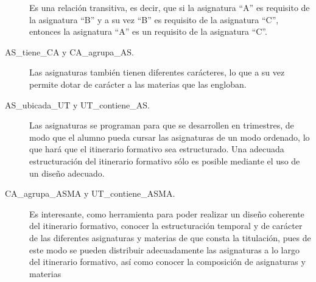 \begin{description}
    		Es una relación transitiva, es decir, que si la asignatura ``A'' es requisito de la asignatura ``B'' y a su vez ``B'' es requisito de la asignatura ``C'', entonces la asignatura ``A'' es un requisito de la asignatura ``C''.
	    
        
    
    		\item [AS\_tiene\_CA y CA\_agrupa\_AS.] Las asignaturas también tienen diferentes carácteres, lo que a su vez permite dotar de carácter a las materias que las engloban.
	    
	    
    
    		\item [AS\_ubicada\_UT y UT\_contiene\_AS.] Las asignaturas se programan para que se desarrollen en trimestres, de modo que el alumno pueda cursar las asignaturas de un modo ordenado, lo que hará que el itinerario formativo sea estructurado. Una adecuada estructuración del itinerario formativo sólo es posible mediante el uso de un diseño adecuado.
	    
		
    
    
   	 	\item [CA\_agrupa\_ASMA y UT\_contiene\_ASMA.] Es interesante, como herramienta para poder realizar un diseño coherente del itinerario formativo, conocer la estructuración temporal y de carácter de las diferentes asignaturas y materias de que consta la titulación, pues de este modo se pueden distribuir adecuadamente las asignaturas a lo largo del itinerario formativo, así como conocer la composición de asignaturas y materias
	    
        
    
	\end{description}
  
